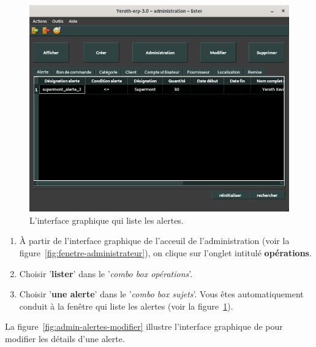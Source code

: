 \begin{figure}[!htpb]
	\centering
	\includegraphics[scale=0.45]{images/alerte-lister.png}
	\caption{L'interface graphique qui liste les alertes.}
	\label{fig:admin-alertes-lister}
\end{figure}

\begin{enumerate}[1)]
	\item \`A partir de l'interface graphique de l'acceuil de
		l'administration (voir la figure~\ref{fig:fenetre-administrateur}),
		on clique sur l'onglet intitul\'e \textbf{op\'erations}. 
		
	\item Choisir '\textbf{lister}' dans le '\emph{combo box
		op\'erations}'.
		
	\item Choisir '\textbf{une alerte}' dans le '\emph{combo box
		sujets}'. Vous \^etes automatiquement conduit \`a la fen\^etre
		qui liste les alertes (voir la figure~\ref{fig:admin-alertes-lister}).
\end{enumerate}


\newpage
{}

La figure~\ref{fig:admin-alertes-modifier} illustre
l'interface graphique de \yeroth pour modifier les
d\'etails d'une alerte.\\

